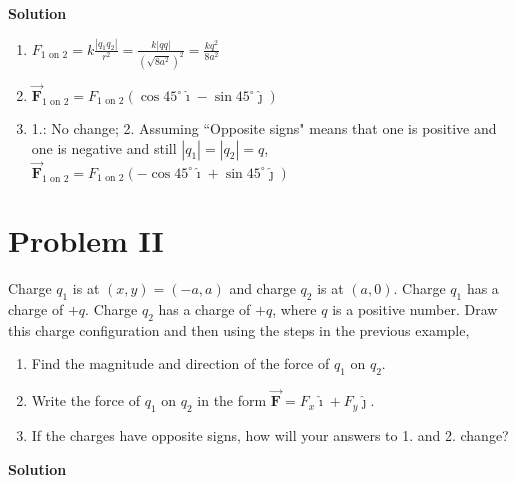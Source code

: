 \documentclass{article}
\renewcommand{\mbox}{\text}
\newcommand{\ds}[0]{\displaystyle}
\newcommand{\ihat}[0]{\hat{\boldsymbol{\imath}}}
\newcommand{\jhat}[0]{\hat{\boldsymbol{\jmath}}}
\newcommand{\bfvec}[1]{\vec{\mathbf{#1}}}
\begin{document}
\ifsolutions
{\bf Solution}

    \begin{enumerate}

      \item $\ds F_{1\mbox{ on } 2}=k\frac{|q_1q_2|}{r^2}=\frac{k|qq|}{(\sqrt{8a^2})^2}=\frac{kq^2}{8a^2}$

      \item $\bfvec{F}_{1\mbox{ on } 2} = F_{1\mbox{ on } 2}(\cos 45^\circ \ihat - \sin 45^\circ \jhat)$

      \item 1.: No change; 2. Assuming ``Opposite signs" means that one is positive and one is negative and still $|q_1|=|q_2|=q$, $\bfvec{F}_{1\mbox{ on } 2} = F_{1\mbox{ on } 2}(-\cos 45^\circ \ihat + \sin 45^\circ \jhat)$

    \end{enumerate}
\else



\newpage
\fi
\ifsolutions\else


  \newpage
\fi

\section{Problem II}

Charge $q_1$ is at $(x,y)=(-a,a)$ and charge $q_2$ is at $(a, 0)$. Charge $q_1$ has a charge of $+q$. Charge $q_2$ has a charge of $+q$, where $q$ is a positive number. Draw this charge configuration and then using the steps in the previous example,

\begin{enumerate}

  \item Find the magnitude and direction of the force of $q_1$ on $q_2$.

  \item Write the force of $q_1$ on $q_2$ in the form $\bfvec{F}=F_x\ihat + F_y\jhat$.

  \item If the charges have opposite signs, how will your answers to 1. and 2. change?

\end{enumerate}

\ifsolutions
{\bf Solution}


\end{document}
